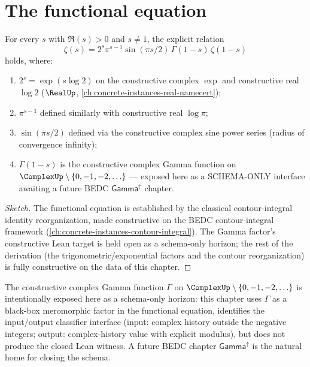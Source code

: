 \section{The functional equation}

\begin{theorem}
\label{thm:functional-equation}
For every \(s\) with \(\Re(s) > 0\) and \(s \neq 1\), the explicit relation
$$\zeta(s) = 2^s \pi^{s-1} \sin(\pi s / 2) \, \Gamma(1 - s) \, \zeta(1 - s)$$
holds, where:
\begin{enumerate}
  \item \(2^s = \exp(s \log 2)\) on the constructive complex \(\exp\) and constructive real \(\log 2\) (\(\RealUp\), \autoref{ch:concrete-instances-real-namecert});
  \item \(\pi^{s-1}\) defined similarly with constructive real \(\log \pi\);
  \item \(\sin(\pi s / 2)\) defined via the constructive complex sine power series (radius of convergence infinity);
  \item \(\Gamma(1 - s)\) is the constructive complex Gamma function on \(\ComplexUp \setminus \{0, -1, -2, \ldots\}\) --- exposed here as a SCHEMA-ONLY interface awaiting a future BEDC \(\mathsf{Gamma}^{\uparrow}\) chapter.
\end{enumerate}
\end{theorem}
\begin{proof}[Sketch]
The functional equation is established by the classical contour-integral identity reorganization, made constructive on the BEDC contour-integral framework (\autoref{ch:concrete-instances-contour-integral}). The Gamma factor's constructive Lean target is held open as a schema-only horizon; the rest of the derivation (the trigonometric/exponential factors and the contour reorganization) is fully constructive on the data of this chapter.
\end{proof}

\begin{remark}
\label{rem:gamma-schema-horizon}
The constructive complex Gamma function \(\Gamma\) on \(\ComplexUp \setminus \{0, -1, -2, \ldots\}\) is intentionally exposed here as a schema-only horizon: this chapter uses \(\Gamma\) as a black-box meromorphic factor in the functional equation, identifies the input/output classifier interface (input: complex history outside the negative integers; output: complex-history value with explicit modulus), but does not produce the closed Lean witness. A future BEDC chapter \(\mathsf{Gamma}^{\uparrow}\) is the natural home for closing the schema.
\end{remark}

